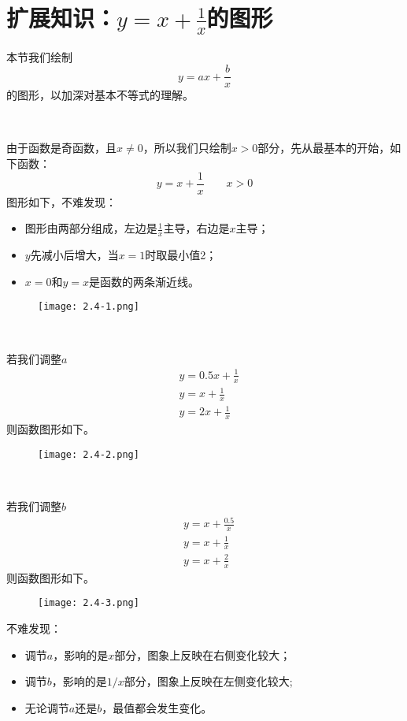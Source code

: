 \section{扩展知识：\texorpdfstring{$y=x+\frac{1}{x}$}{y=x+1/x}的图形}

本节我们绘制
\[
y=ax+\frac{b}{x}
\]
的图形，以加深对基本不等式的理解。

~

由于函数是奇函数，且$x\ne 0$，所以我们只绘制$x>0$部分，先从最基本的开始，如下函数：
\[
y=x+\frac{1}{x} \qquad x>0
\]
图形如下，不难发现：
\begin{itemize}
    \item 图形由两部分组成，左边是$\frac{1}{x}$主导，右边是$x$主导；
    \item $y$先减小后增大，当$x=1$时取最小值2；
    \item $x=0$和$y=x$是函数的两条渐近线。
\end{itemize}

\begin{figure}[h]
\centering
\texttt{[image: 2.4-1.png]}
\end{figure}

~

若我们调整$a$
\begin{align*}
&y=0.5x+\frac{1}{x} \\
&y=x+\frac{1}{x} \\
&y=2x+\frac{1}{x}
\end{align*}
则函数图形如下。

\begin{figure}[ht]
\centering
\texttt{[image: 2.4-2.png]}
\end{figure}

~

若我们调整$b$
\begin{align*}
&y=x+\frac{0.5}{x} \\
&y=x+\frac{1}{x} \\
&y=x+\frac{2}{x}
\end{align*}
则函数图形如下。

\begin{figure}[h]
\centering
\texttt{[image: 2.4-3.png]}
\end{figure}

不难发现：
\begin{itemize}
    \item 调节$a$，影响的是$x$部分，图象上反映在右侧变化较大；
    \item 调节$b$，影响的是$1/x$部分，图象上反映在左侧变化较大;
    \item 无论调节$a$还是$b$，最值都会发生变化。
\end{itemize}





